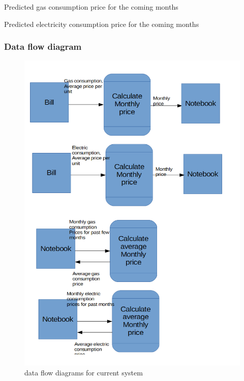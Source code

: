 \begin{algorithm}[H]
	\caption{Predicted gas consumption price for the coming months}
\begin{algorithmic}[H]
\end{algorithmic}
\end{algorithm}

\begin{algorithm}[H]
	\caption{Predicted electricity consumption price for the coming months}
\begin{algorithmic}[H]
\end{algorithmic}
\end{algorithm}

\subsubsection{Data flow diagram}
\begin{figure}[H]
    \includegraphics[width=\textwidth]{./dataflowdiagrams1.png}
    \caption{data flow diagrams for current system} \label{fig:dataflowdiagrams}
\end{figure}

